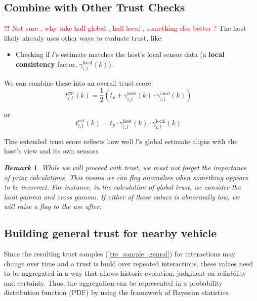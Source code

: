 \documentclass[letterpaper, 10pt, conference]{ieeeconf}  %
\def\eqref#1{(\ref{#1})}
\newtheorem{remark}{\it Remark}%
\begin{document}
\subsection{Combine with Other Trust Checks}  
\textcolor{red}{ !!! Not sure , why take half global , half local , something else better ?}
    The host likely already uses other ways to evaluate trust, like:
    \begin{itemize}
        \item Checking if \( l \)'s estimate matches the host's local sensor data (a \textbf{local consistency} factor, \( \gamma_{i,l}^{\text{local}}(k) \)).
    \end{itemize}
    We can combine these into an overall trust score:
    \begin{equation}\label{trs_sample_genral}
    t_{i,l}^{\text{ext}}(k) = \frac{1}{2}(t_y +  \gamma_{i,l}^{\text{host}}(k) \cdot \gamma_{i,l}^{\text{local}}(k) 
    )    
    \end{equation}

    or
\begin{equation}\label{trs_sample_genral}
    t_{i,l}^{\text{ext}}(k) = t_y \cdot  \gamma_{i,l}^{\text{host}}(k) \cdot \gamma_{i,l}^{\text{local}}(k)     
\end{equation}
    
    This extended trust score reflects how well \( l \)'s global estimate aligns with the host's view and its own sensors

\begin{remark}
    While we will proceed with trust, we must not forget the importance of prior calculations. This means we can flag anomalies when something appears to be incorrect. For instance, in the calculation of global trust, we consider the local gamma and cross gamma. If either of these values is abnormally low, we will raise a flag to the use after.
\end{remark}




\subsection{Building general trust for nearby vehicle}
Since the resulting trust samples \eqref{trs_sample_genral} for interactions may change over time and a trust is build over repeated interactions, these values need to be aggregated in a way that allows historic evolution, judgment on reliability and
certainty. Thus, the aggregation can be represented in a probability distribution function (PDF) by using the framework
of Bayesian statistics.
\end{document}
